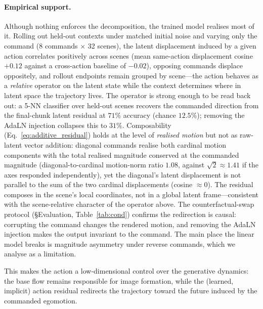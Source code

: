 \documentclass[letterpaper]{article} %
\begin{document}
\paragraph{Empirical support.} Although nothing enforces the decomposition, the trained model realises most of it. Rolling out held-out contexts under matched initial noise and varying only the command (8 commands $\times$ 32 scenes), the latent displacement induced by a given action correlates positively across scenes (mean same-action displacement cosine $+0.12$ against a cross-action baseline of $-0.02$), opposing commands displace oppositely, and rollout endpoints remain grouped by scene---the action behaves as a \emph{relative} operator on the latent state while the context determines where in latent space the trajectory lives. The operator is strong enough to be read back out: a 5-NN classifier over held-out scenes recovers the commanded direction from the final-chunk latent residual at $71\%$ accuracy (chance $12.5\%$); removing the AdaLN injection collapses this to $31\%$. Composability (Eq.~\eqref{eq:additive_residual}) holds at the level of \emph{realised motion} but not as raw-latent vector addition: diagonal commands realise both cardinal motion components with the total realised magnitude conserved at the commanded magnitude (diagonal-to-cardinal motion-norm ratio $1.08$, against $\sqrt{2}\!\approx\!1.41$ if the axes responded independently), yet the diagonal's latent displacement is not parallel to the sum of the two cardinal displacements (cosine $\approx 0$). The residual composes in the scene's local coordinates, not in a global latent frame---consistent with the scene-relative character of the operator above.
The counterfactual-swap protocol (\S Evaluation, Table~\ref{tab:cond}) confirms the redirection is causal: corrupting the command changes the rendered motion, and removing the AdaLN injection makes the output invariant to the command. The main place the linear model breaks is magnitude asymmetry under reverse commands, which we analyse as a limitation.

This makes the action a low-dimensional control over the generative dynamics: the base flow remains responsible for image formation, while the (learned, implicit) action residual redirects the trajectory toward the future induced by the commanded egomotion.
\end{document}
